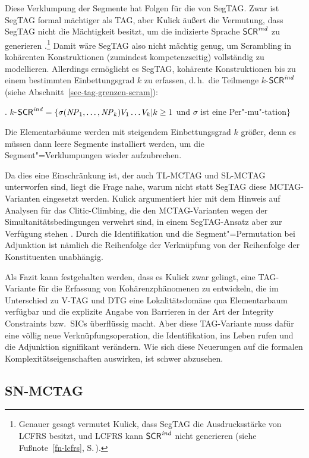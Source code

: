 Diese Verklumpung der Segmente hat Folgen für die  von SegTAG. Zwar ist SegTAG formal mächtiger als TAG, aber Kulick äu\ss ert die Vermutung, dass SegTAG nicht die Mächtigkeit besitzt, um die indizierte Sprache $\mathsf{SCR}^{\mathit{ind}}$ zu generieren \citep[215]{Kulick:00}.\footnote{Genauer gesagt vermutet Kulick, dass SegTAG die Ausdrucksstärke von LCFRS besitzt, und LCFRS kann $\mathsf{SCR}^{\mathit{ind}}$ nicht generieren (siehe Fußnote~\ref{fn-lcfrs}, S.\,\pageref{fn-lcfrs}).} Damit wäre SegTAG also nicht mächtig genug, um Scrambling in kohärenten Konstruktionen (zumindest kompetenzseitig) vollständig zu modellieren. Allerdings ermöglicht es SegTAG, kohärente Konstruktionen bis zu einem bestimmten Einbettungsgrad $k$ zu erfassen, d.\,h.\ die Teilmenge $k$-$\mathsf{SCR}^{\mathit{ind}}$ (siehe Abschnitt~\ref{sec-tag-grenzen-scram}):

\ex. $k$-$\mathsf{SCR}^{\mathit{ind}} = \{ \sigma(\mathit{NP}_1,\ldots,\mathit{NP}_k) V_1 \ldots V_k | k \geq 1$ und $\sigma$ ist eine Per"-mu"-tation$\}$

Die Elementarbäume werden mit steigendem Einbettungsgrad $k$ grö\ss er, denn es müssen dann leere Segmente installiert werden, um die Segment"=Verklumpungen wieder aufzubrechen. 

Da dies eine Einschränkung ist, der auch TL-MCTAG und SL-MCTAG unterworfen sind, liegt die Frage nahe, warum nicht statt SegTAG diese MCTAG-Varianten eingesetzt werden. Kulick argumentiert hier mit dem Hinweis auf Analysen für das Clitic-Climbing, die den MCTAG-Varianten wegen der Simultanitätsbedingungen verwehrt sind, in einem SegTAG-Ansatz aber zur Verfügung stehen \citep[53ff]{Kulick:00}. Durch die Identifikation und die Segment"=Permutation bei Adjunktion ist nämlich die Reihenfolge der Verknüpfung von der Reihenfolge der Konstituenten unabhängig.     

Als Fazit kann festgehalten werden, dass es Kulick zwar gelingt, eine TAG-Variante für die Erfassung von Kohärenzphänomenen zu entwickeln, die im Unterschied zu V-TAG und DTG eine Lokalitätsdomäne qua Elementarbaum verfügbar und die explizite Angabe von Barrieren in der Art der Integrity Constraints bzw.\ SICs überflüssig macht. Aber diese TAG-Variante muss dafür eine völlig neue Verknüpfungsoperation, die Identifikation, ins Leben rufen und die Adjunktion signifikant verändern. Wie sich diese Neuerungen auf die formalen Komplexitätseigenschaften auswirken, ist schwer abzusehen.


\subsection{SN-MCTAG}\label{sec-snmctag}

